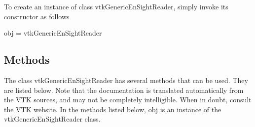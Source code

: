 To create an instance of class vtk\-Generic\-En\-Sight\-Reader, simply invoke its constructor as follows \begin{DoxyVerb}  obj = vtkGenericEnSightReader
\end{DoxyVerb}
 \hypertarget{vtkwidgets_vtkxyplotwidget_Methods}{}\subsection{Methods}\label{vtkwidgets_vtkxyplotwidget_Methods}
The class vtk\-Generic\-En\-Sight\-Reader has several methods that can be used. They are listed below. Note that the documentation is translated automatically from the V\-T\-K sources, and may not be completely intelligible. When in doubt, consult the V\-T\-K website. In the methods listed below, {\ttfamily obj} is an instance of the vtk\-Generic\-En\-Sight\-Reader class. 
